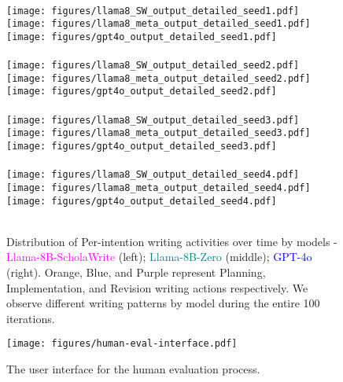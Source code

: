 \begin{figure*}
    \centering
    \makebox[0.33\textwidth]{\small \textcolor{magenta}{Llama-8B-ScholaWrite}}
    \makebox[0.32\textwidth]{\small \textcolor{teal}{Llama-8B-Zero}}
    \makebox[0.32\textwidth]{\small \textcolor{blue}{GPT-4o}} 
    \\[1em]
        \texttt{[image: figures/llama8\_SW\_output\_detailed\_seed1.pdf]}
        \texttt{[image: figures/llama8\_meta\_output\_detailed\_seed1.pdf]}
        \texttt{[image: figures/gpt4o\_output\_detailed\_seed1.pdf]}
        \\[2pt]
    \\[0.5em]
        \texttt{[image: figures/llama8\_SW\_output\_detailed\_seed2.pdf]}
        \texttt{[image: figures/llama8\_meta\_output\_detailed\_seed2.pdf]}
        \texttt{[image: figures/gpt4o\_output\_detailed\_seed2.pdf]}
        \\[2pt]
    \\[0.5em]
        \texttt{[image: figures/llama8\_SW\_output\_detailed\_seed3.pdf]}
        \texttt{[image: figures/llama8\_meta\_output\_detailed\_seed3.pdf]}
        \texttt{[image: figures/gpt4o\_output\_detailed\_seed3.pdf]}
        \\[2pt]
    \\[0.5em]
        \texttt{[image: figures/llama8\_SW\_output\_detailed\_seed4.pdf]}
        \texttt{[image: figures/llama8\_meta\_output\_detailed\_seed4.pdf]}
        \texttt{[image: figures/gpt4o\_output\_detailed\_seed4.pdf]}
        \\[2pt]
    \\[0.5em]
    \caption{Distribution of Per-intention writing activities over time by models - \textcolor{magenta}{Llama-8B-ScholaWrite} (left); \textcolor{teal}{Llama-8B-Zero} (middle); \textcolor{blue}{GPT-4o} (right). Orange, Blue, and Purple represent Planning, Implementation, and Revision writing actions respectively. We observe different writing patterns by model during the entire 100 iterations. }
    \label{fig:writing-step-intention-all-model}
\end{figure*}





\begin{figure*}
    \centering
    \texttt{[image: figures/human-eval-interface.pdf]}
    \caption{The user interface for the human evaluation process. }
    \label{fig:human-eval-interface}
\end{figure*}
